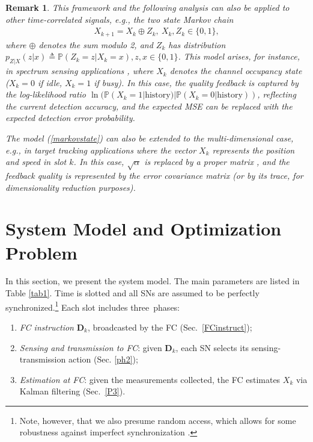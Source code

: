 \documentclass[10pt,twocolumn,twoside]{IEEEtran}
\theoremstyle{plain}
\newtheorem{remark}{Remark}
\begin{document}
 \begin{remark}
This framework and the following analysis can also be applied  to other time-correlated signals, \emph{e.g.}, the two state Markov chain
 \begin{align}
 X_{k+1}=X_k\oplus Z_k,\ X_{k},Z_k\in\{0,1\},
 \end{align}
 where $\oplus$ denotes the sum modulo 2,
  and $Z_k$ has distribution $p_{Z|X}(z|x){\triangleq}\mathbb P(Z_k{=}z|X_k{=}x),z,x{\in}\{0,1\}$.
 This model  arises, for instance, in spectrum sensing applications \cite{MicheISIT},
 where $X_k$ denotes the channel occupancy state ($X_k{=}0$ if idle, $X_k{=}1$ if busy).
In this case, the quality feedback is captured by the log-likelihood ratio $\ln(\mathbb P(X_k{=}1|\text{history})|\mathbb P(X_k{=}0|\text{history}))$,
 reflecting the current detection accuracy, and the expected MSE can be replaced with the expected detection error probability.
 
The model (\ref{markovstate}) can also be extended to the multi-dimensional case, \emph{e.g.},
 in target tracking applications where the vector $X_k$ represents the position and speed in slot $k$.
 In this case, $\sqrt{\alpha}$ is replaced by a proper matrix \cite{Xiao}, and the feedback quality is represented by the error covariance matrix (or by its trace, for
 dimensionality reduction purposes).
 \end{remark}
\section{System Model and Optimization Problem}
\label{sysmo}
 In this section, we present the system model. The main parameters are listed in Table \ref{tab1}.
Time is slotted and all SNs are assumed to be perfectly synchronized.\footnote{Note, however, that 
we also presume random access, which allows for some robustness against imperfect synchronization \cite{Gaudenzi}.}
 Each slot includes three~phases:
 \begin{enumerate}
 \item \emph{FC instruction} $\mathbf D_k$, broadcasted by the FC (Sec.~\ref{FCinstruct});
 \item \emph{Sensing and transmission to FC}: given $\mathbf D_k$, each SN selects its
 sensing-transmission action (Sec. \ref{ph2});
 \item \emph{Estimation at FC}: given the measurements collected, the FC estimates $X_k$ via Kalman filtering (Sec.~\ref{P3}).
 \end{enumerate}
 \vspace{-5mm}
\end{document}
